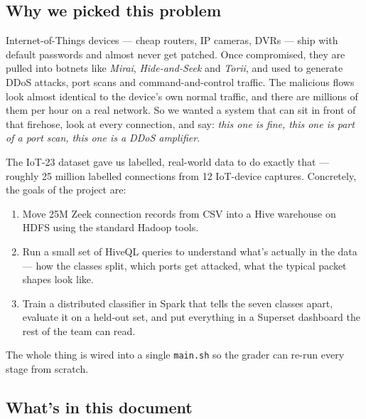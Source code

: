 \documentclass[11pt,a4paper]{article}
\begin{document}
\subsection{Why we picked this problem}

Internet-of-Things devices --- cheap routers, IP cameras, DVRs --- ship
with default passwords and almost never get patched. Once compromised, they
are pulled into botnets like \emph{Mirai}, \emph{Hide-and-Seek} and
\emph{Torii}, and used to generate DDoS attacks, port scans and
command-and-control traffic. The malicious flows look almost identical to
the device's own normal traffic, and there are millions of them per hour on
a real network. So we wanted a system that can sit in front of that
firehose, look at every connection, and say: \emph{this one is fine, this
one is part of a port scan, this one is a DDoS amplifier}.

The IoT-23 dataset gave us labelled, real-world data to do exactly that ---
roughly 25 million labelled connections from 12 IoT-device captures.
Concretely, the goals of the project are:

\begin{enumerate}[leftmargin=2em]
    \item Move 25M Zeek connection records from CSV into a Hive warehouse on
    HDFS using the standard Hadoop tools.
    \item Run a small set of HiveQL queries to understand what's actually in
    the data --- how the classes split, which ports get attacked, what the
    typical packet shapes look like.
    \item Train a distributed classifier in Spark that tells the seven
    classes apart, evaluate it on a held-out set, and put everything in a
    Superset dashboard the rest of the team can read.
\end{enumerate}

The whole thing is wired into a single \texttt{main.sh} so the grader can
re-run every stage from scratch.

\subsection{What's in this document}
\end{document}
